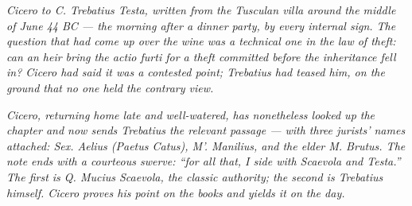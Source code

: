 
\textit{Cicero to C. Trebatius Testa, written from the Tusculan
villa around the middle of June 44 BC --- the morning after a
dinner party, by every internal sign. The question that had come
up over the wine was a technical one in the law of theft: can an
heir bring the \textit{actio furti} for a theft committed before
the inheritance fell in? Cicero had said it was a contested point;
Trebatius had teased him, on the ground that no one held the
contrary view.}

\textit{Cicero, returning home late and well-watered, has
nonetheless looked up the chapter and now sends Trebatius the
relevant passage --- with three jurists' names attached:
Sex. Aelius (Paetus Catus), M'. Manilius, and the elder M. Brutus.
The note ends with a courteous swerve: ``for all that, I side
with Scaevola and Testa.'' The first is Q. Mucius Scaevola, the
classic authority; the second is Trebatius himself. Cicero proves
his point on the books and yields it on the day.}
